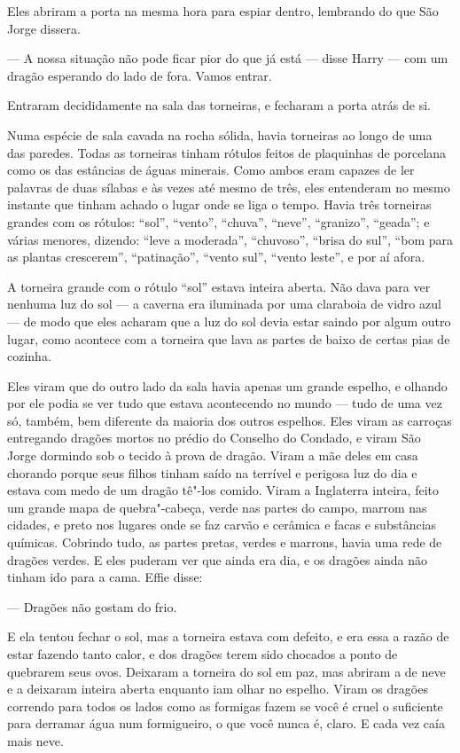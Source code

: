 Eles abriram a porta na mesma hora para espiar dentro, lembrando do
que São Jorge dissera.

--- A nossa situação não pode ficar pior do que já está --- disse Harry ---
com um dragão esperando do lado de fora. Vamos entrar.

Entraram decididamente na sala das torneiras, e fecharam a porta
atrás de si.

Numa espécie de sala cavada na rocha sólida,
havia torneiras ao longo de uma das paredes. Todas as
torneiras tinham rótulos feitos de plaquinhas de porcelana como os
das estâncias de águas minerais. Como ambos eram capazes de ler
palavras de duas sílabas e às vezes até mesmo de três, eles
entenderam no mesmo instante que tinham achado o lugar onde se liga o
tempo. Havia três torneiras grandes com os rótulos: “sol”, “vento”,
“chuva”, “neve”, “granizo”, “geada”; e várias menores, dizendo: “leve
a moderada”, “chuvoso”, “brisa do sul”, “bom para as plantas
crescerem”, “patinação”, “vento sul”, “vento leste”, e por aí afora.


A torneira grande com o rótulo “sol” estava inteira aberta. Não
dava para ver nenhuma luz do sol --- a caverna era iluminada por uma
claraboia de vidro azul --- de modo que eles acharam que a luz do sol
devia estar saindo por algum outro lugar, como acontece com a
torneira que lava as partes de baixo de certas pias de cozinha.

Eles viram que do outro lado da sala havia apenas um grande
espelho, e olhando por ele podia se ver tudo que estava acontecendo
no mundo --- tudo de uma vez só, também, bem diferente da maioria dos
outros espelhos. Eles viram as carroças entregando dragões mortos no
prédio do Conselho do Condado, e viram São Jorge dormindo sob o
tecido à prova de dragão. Viram a mãe deles em casa chorando
porque seus filhos tinham saído na terrível e perigosa luz do dia e
estava com medo de um dragão tê"-los comido. Viram a Inglaterra
inteira, feito um grande mapa de quebra"-cabeça, verde nas partes do
campo, marrom nas cidades, e preto nos lugares onde se faz carvão e
cerâmica e facas e substâncias químicas. Cobrindo tudo, as partes
pretas, verdes e marrons, havia uma rede de dragões verdes. E eles
puderam ver que ainda era dia, e os dragões ainda não tinham ido para
a cama. Effie disse:

--- Dragões não gostam do frio.

E ela tentou fechar o sol, mas a torneira estava com defeito, e era
essa a razão de estar fazendo tanto calor, e dos dragões terem sido
chocados a ponto de quebrarem seus ovos. Deixaram a
torneira do sol em paz, mas abriram a de neve e a deixaram inteira
aberta enquanto iam olhar no espelho. Viram os dragões
correndo para todos os lados como as formigas fazem se você é cruel o
suficiente para derramar água num formigueiro, o que você nunca é,
claro. E cada vez caía mais neve.

